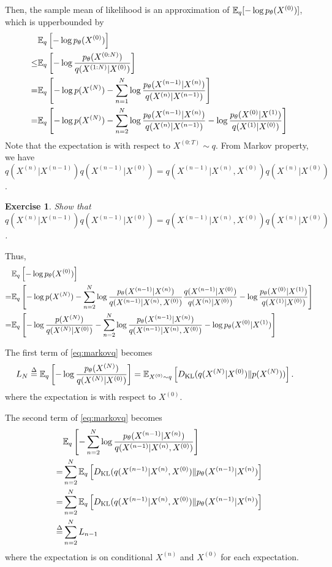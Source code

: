 \documentclass[11pt, a4paper]{article}
\newtheorem{exercise}{Exercise}
\begin{document}
Then, the sample mean of likelihood is an approximation of $\mathbb{E}_q[-\log p_{\theta}(X^{(0)})]$, which is upperbounded by
\begin{align}
    &\mathbb{E}_q\left[-\log p_{\theta}(X^{(0)})\right] \\
    \leq& \mathbb{E}_q\left[-\log \frac{p_{\theta}(X^{(0:N)})}{q(X^{(1:N)}|X^{(0)})} \right]\\
    =& \mathbb{E}_q\left[-\log p (X^{(N)}) - \sum_{n=1}^N \log \frac{p_{\theta}(X^{(n-1)}|X^{(n)})}{q(X^{(n)}|X^{(n-1)})} \right]\\
    =& \mathbb{E}_q\left[-\log p (X^{(N)}) - \sum_{n=2}^N \log \frac{p_{\theta}(X^{(n-1)}|X^{(n)})}{q(X^{(n)}|X^{(n-1)})} -\log \frac{p_{\theta}(X^{(0)}|X^{(1)})}{q(X^{(1)}|X^{(0)})}\right]
\end{align}
Note that the expectation is with respect to $X^{(0:T)}\sim q$.
From Markov property, we have $q(X^{(n)}|X^{(n-1)}) q(X^{(n-1)}|X^{(0)}) = q(X^{(n-1)}|X^{(n)}, X^{(0)}) q(X^{(n)}|X^{(0)})$.
\begin{exercise}
    Show that $q(X^{(n)}|X^{(n-1)}) q(X^{(n-1)}|X^{(0)}) = q(X^{(n-1)}|X^{(n)}, X^{(0)}) q(X^{(n)}|X^{(0)})$.
\end{exercise}
Thus,
\begin{align}
    &\mathbb{E}_q\left[-\log p_{\theta}(X^{(0)})\right] \\
    =& \mathbb{E}_q\left[-\log p (X^{(N)}) 
        - \sum_{n=2}^N \log \frac{p_{\theta}(X^{(n-1)}|X^{(n)})}{q(X^{(n-1)}|X^{(n)}, X^{(0)})}\frac{q(X^{(n-1)}|X^{(0)})}{q(X^{(n)}|X^{(0)})} 
        -\log \frac{p_{\theta}(X^{(0)}|X^{(1)})}{q(X^{(1)}|X^{(0)})}\right]\\
    =& \mathbb{E}_q\left[-\log \frac{p(X^{(N)})}{q(X^{(N)}|X^{(0)})} - \sum_{n=2}^N \log \frac{p_{\theta}(X^{(n-1)}|X^{(n)})}{q(X^{(n-1)}|X^{(n)}, X^{(0)})} -\log p_{\theta}(X^{(0)}|X^{(1)})\right]\label{eq:markovq}
\end{align}


The first term of \eqref{eq:markovq} becomes
\begin{align}
    L_N \stackrel{\Delta}{=} \mathbb{E}_q\left[-\log \frac{p_\theta (X^{(N)})}{q(X^{(N)}|X^{(0)})}\right]
    &= \mathbb{E}_{X^{(0)}\sim q}\left[D_\mathrm{KL}(q(X^{(N)}|X^{(0)}) \| p(X^{(N)}))\right].
\end{align}
where the expectation is with respect to $X^{(0)}$.

The second term of \eqref{eq:markovq} becomes
\begin{align}
    &\mathbb{E}_q\left[- \sum_{n=2}^N \log \frac{p_{\theta}(X^{(n-1)}|X^{(n)})}{q(X^{(n-1)}|X^{(n)}, X^{(0)})}\right]\\
    =& \sum_{n=2}^N \mathbb{E}_q \left[ D_\mathrm{KL} (q(X^{(n-1)}|X^{(n)}, X^{(0)}) \| p_{\theta}(X^{(n-1)}|X^{(n)})\right]\\
    =& \sum_{n=2}^N \mathbb{E}_q \left[ D_\mathrm{KL} (q(X^{(n-1)}|X^{(n)}, X^{(0)}) \| p_{\theta}(X^{(n-1)}|X^{(n)})\right]\\
    \stackrel{\Delta}{=}& \sum_{n=2}^N L_{n-1}
\end{align}
where the expectation is on conditional $X^{(n)}$ and $X^{(0)}$ for each expectation.
\end{document}
